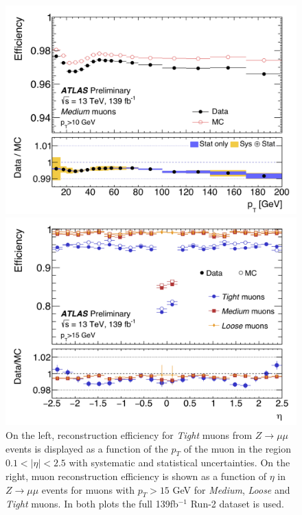 \begin{figure}[!h]
  \centering
  \begin{minipage}[b]{0.45\textwidth}
    \includegraphics[width=\textwidth]{Pictures/efficiencyoverpt.PNG}
  \end{minipage}
  \hspace{.5cm}
  \begin{minipage}[b]{0.45\textwidth}
    \includegraphics[width=\textwidth]{Pictures/efficiencyovereta.PNG}
  \end{minipage}
  \caption{On the left, reconstruction efficiency for \textit{Tight} muons from $Z \rightarrow \mu\mu$ events is displayed as a function of the $p_T$ of the muon in the region $0.1 < |\eta| < 2.5$ with systematic and statistical uncertainties.  On the right, muon reconstruction efficiency is shown as a function of $\eta$ in $Z \rightarrow \mu\mu$ events for muons with $p_T > 15$ GeV for \textit{Medium}, \textit{Loose} and \textit{Tight} muons. In both plots the full 139fb$^{-1}$ Run-2 dataset is used\cite{MCPPlots}.}
  \label{fig:efficiency}
\end{figure}

